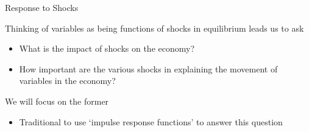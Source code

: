 \documentclass{beamer}
\begin{document}
	
\begin{frame}{Response to Shocks}

Thinking of variables as being functions of shocks in equilibrium leads us to ask
\begin{itemize}
\item	What is the impact of shocks on the economy?
\item	How important are the various shocks in explaining the movement of variables in the economy?
\end{itemize}

\vspace{3mm}
We will focus on the former
\begin{itemize}
\item	Traditional to use `impulse response functions' to answer this question
\end{itemize}

\end{frame}

%
%	
%
%
%

\end{document}
